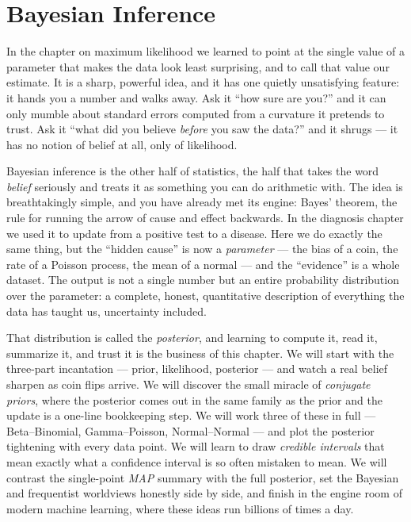 \chapter{Bayesian Inference}

In the chapter on maximum likelihood we learned to point at the single value of a
parameter that makes the data look least surprising, and to call that value our estimate.
It is a sharp, powerful idea, and it has one quietly unsatisfying feature: it hands you a
number and walks away. Ask it ``how sure are you?'' and it can only mumble about standard
errors computed from a curvature it pretends to trust. Ask it ``what did you believe
\emph{before} you saw the data?'' and it shrugs --- it has no notion of belief at all,
only of likelihood.

Bayesian inference is the other half of statistics, the half that takes the word
\emph{belief} seriously and treats it as something you can do arithmetic with. The idea
is breathtakingly simple, and you have already met its engine: Bayes' theorem, the rule
for running the arrow of cause and effect backwards. In the diagnosis chapter we used it
to update from a positive test to a disease. Here we do exactly the same thing, but the
``hidden cause'' is now a \emph{parameter} --- the bias of a coin, the rate of a Poisson
process, the mean of a normal --- and the ``evidence'' is a whole dataset. The output is
not a single number but an entire probability distribution over the parameter: a complete,
honest, quantitative description of everything the data has taught us, uncertainty
included.

That distribution is called the \emph{posterior}, and learning to compute it, read it,
summarize it, and trust it is the business of this chapter. We will start with the
three-part incantation --- prior, likelihood, posterior --- and watch a real belief
sharpen as coin flips arrive. We will discover the small miracle of \emph{conjugate
priors}, where the posterior comes out in the same family as the prior and the update is a
one-line bookkeeping step. We will work three of these in full --- Beta--Binomial,
Gamma--Poisson, Normal--Normal --- and plot the posterior tightening with every data
point. We will learn to draw \emph{credible intervals} that mean exactly what a confidence
interval is so often mistaken to mean. We will contrast the single-point \emph{MAP}
summary with the full posterior, set the Bayesian and frequentist worldviews honestly side
by side, and finish in the engine room of modern machine learning, where these ideas run
billions of times a day.

